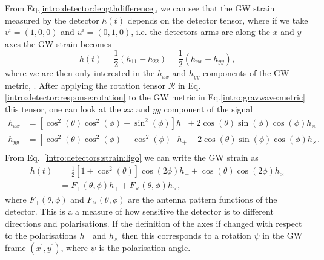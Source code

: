 From Eq.\ref{intro:detector:lengthdifference}, we can see that the \gls{GW} strain measured by the detector $h(t)$ depends on the detector tensor, where if we take $v^i = (1,0,0)$ and $u^i = (0,1,0)$, i.e. the detectors arms are along the $x$ and $y$ axes the \gls{GW} strain becomes 
\begin{equation}
    \label{intro:detectors:strain:ligo}
    h(t) = \frac{1}{2} \left( h_{11} - h_{22} \right) = \frac{1}{2} \left( h_{xx} - h_{yy} \right),
\end{equation}
where we are then only interested in the $h_{xx}$ and $h_{yy}$ components of the \gls{GW} metric, \citep{maggioreGravitationalWaves}.
After applying the rotation tensor $\mathcal{R}$ in Eq.\ref{intro:detector:response:rotation} to the \gls{GW} metric in Eq.\ref{intro:gravwave:metric} this tensor, one can look at the $xx$ and $yy$ component of the signal
\begin{equation}
    \begin{split}
        h_{xx} &= \left[ \cos^2(\theta) \cos^2 (\phi) - \sin^2 (\phi)\right]h_{+} + 2\cos (\theta) \sin (\phi) \cos (\phi) h_{\times}\\
        h_{yy} &= \left[ \cos^2(\theta) \cos^2 (\phi) - \cos^2 (\phi)\right]h_{+} - 2\cos(\theta) \sin (\phi) \cos(\phi) h_{\times} . \\
    \end{split}
\end{equation}
From Eq.~\ref{intro:detectors:strain:ligo} we can write the \gls{GW} strain as
\begin{equation}
    \label{intro:detector:response:strain:polarisations}
    \begin{split}
        h(t) &= \frac{1}{2} \left[ 1 + \cos^2 \left(\theta\right) \right] \cos\left(2\phi\right) h_{+} + \cos \left(\theta\right) \cos \left(2\phi \right)h_{\times}\\
        &= F_{+}(\theta,\phi)h_{+} + F_{\times}(\theta,\phi)h_{\times},
    \end{split}
\end{equation}
where $F_{+}(\theta,\phi)$ and $F_{\times}(\theta,\phi)$ are the antenna pattern functions of the detector.
This is a a measure of how sensitive the detector is to different directions and polarisations. 
If the definition of the axes if changed with respect to the polarisations $h_{+}$ and $h_{\times}$ then this corresponds to a rotation $\psi$ in the \gls{GW} frame $(x^{\prime}, y^{\prime})$, where $\psi$ is the polarisation angle.

